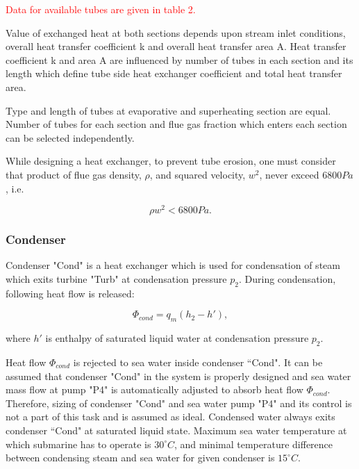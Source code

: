 \documentclass{article}
\begin{document}
	\noindent
	\textcolor{red}{Data for available tubes are given in table 2.}
	
	\noindent
	Value of exchanged heat at both sections depends upon stream inlet conditions, overall heat transfer coefficient k and overall heat transfer area A. Heat transfer coefficient k and area A are influenced by number of tubes in each section and its length which define tube side heat exchanger coefficient and total heat transfer area.
	
	Type and length of tubes at evaporative and superheating section are equal. Number of tubes for each section and flue gas fraction which enters each section can be selected independently.  
	
	While designing a heat exchanger, to prevent tube erosion, one must consider that product of flue gas density, $\rho$, and squared velocity, $w^2$, never exceed $6800 Pa$, i.e. 
	
	\begin{equation}\label{eq:flue_gas_density}
		\rho w^2 < 6800 Pa.
	\end{equation}
	
	\subsubsection*{Condenser}
	
	\noindent
	Condenser "Cond" is a heat exchanger which is used for condensation of steam which exits turbine "Turb" at condensation pressure $p_2$. During condensation, following heat flow is released:
	
	\begin{equation}\label{eq:heat_flow_cond}
		\Phi_{cond} = q_m (h_2 - h'),
	\end{equation}
	
	\noindent
	where $h'$ is enthalpy of saturated liquid water at condensation pressure $p_2$.
	
	\noindent
	Heat flow $\Phi_{cond}$ is rejected to sea water inside condenser “Cond". It can be assumed that condenser "Cond" in the system is properly designed and sea water mass flow at pump "P4" is automatically adjusted to absorb heat flow $\Phi_{cond}$. Therefore, sizing of condenser "Cond" and sea water pump "P4" and its control is not a part of this task and is assumed as ideal. Condensed water always exits condenser “Cond" at saturated liquid state.
	Maximum sea water temperature at which submarine has to operate is $30^{\circ}C$, and minimal temperature difference between condensing steam and sea water for given condenser is $15^{\circ}C$. 
	
\end{document}
